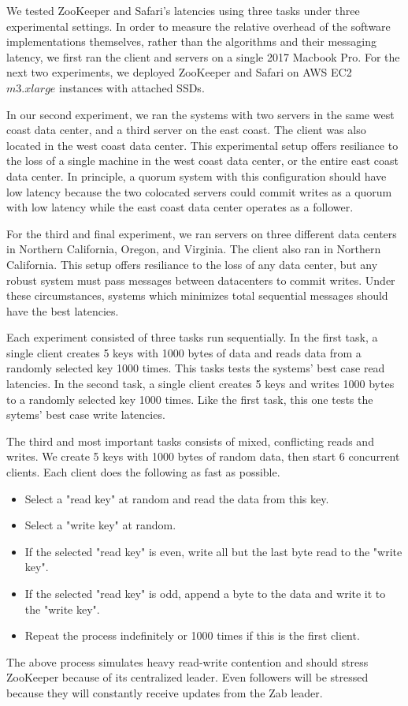 We tested ZooKeeper and Safari's latencies using three tasks under three experimental settings. In
order to measure the relative overhead of the software implementations themselves, rather than the
algorithms and their messaging latency, we first ran the client and servers on a single 2017 Macbook
Pro. For the next two experiments, we deployed ZooKeeper and Safari on AWS EC2 $m3.xlarge$ instances
with attached SSDs.

In our second experiment, we ran the systems with two servers in the same west coast data center,
and a third server on the east coast. The client was also located in the west coast data center.
This experimental setup offers resiliance to the loss of a single machine in the west coast data
center, or the entire east coast data center. In principle, a quorum system with this configuration
should have low latency because the two colocated servers could commit writes as a quorum with low
latency while the east coast data center operates as a follower.

For the third and final experiment, we ran servers on three different data centers in Northern
California, Oregon, and Virginia. The client also ran in Northern California. This setup offers
resiliance to the loss of any data center, but any robust system must pass messages between
datacenters to commit writes. Under these circumstances, systems which minimizes total sequential
messages should have the best latencies.

Each experiment consisted of three tasks run sequentially. In the first task, a single client
creates 5 keys with 1000 bytes of data and reads data from a randomly selected key 1000 times. This
tasks tests the systems' best case read latencies. In the second task, a single client creates 5
keys and writes 1000 bytes to a randomly selected key 1000 times. Like the first task, this one
tests the sytems' best case write latencies.

The third and most important tasks consists of mixed, conflicting reads and writes.  We create 5
keys with 1000 bytes of random data, then start 6 concurrent clients. Each client does the following
as fast as possible.
\begin{itemize}
  \item Select a "read key" at random and read the data from this key.
  \item Select a "write key" at random.
  \item If the selected "read key" is even, write all but the last byte read to the "write key".
  \item If the selected "read key" is odd, append a byte to the data and write it to the "write key".
  \item Repeat the process indefinitely or 1000 times if this is the first client.
\end{itemize}

The above process simulates heavy read-write contention and should stress ZooKeeper because of its
centralized leader. Even followers will be stressed because they will constantly receive updates
from the Zab leader.
